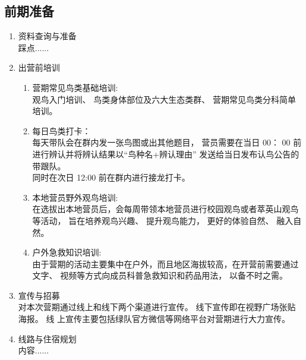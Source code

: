 \documentclass[UTF8,a4paper，12pt]{ctexart}
\begin{document}
\subsection{前期准备}
\begin{enumerate}[itemindent=1em]
    \item  资料查询与准备\\踩点......
    \item  出营前培训\\
        \begin{enumerate}[itemindent=1em]
            \item 营期常见鸟类基础培训:\\观鸟入门培训、 鸟类身体部位及六大生态类群、 营期常见鸟类分科简单培训。
            \item 每日鸟类打卡：\\每天带队会在群内发一张鸟图或出其他题目， 营员需要在当日 00： 00 前进行辨认并将辨认结果以“鸟种名+辨认理由” 发送给当日发布认鸟公告的带跟队。\\同时在次日 12:00 前在群内进行接龙打卡。
            \item 本地营员野外观鸟培训:\\在选拔出本地营员后，会每周带领本地营员进行校园观鸟或者萃英山观鸟等活动， 旨在培养观鸟兴趣、 提升观鸟能力， 更好的体验自然、 融入自然。
            \item 户外急救知识培训:\\由于营期的活动主要集中在户外，而且地区海拔较高，在开营前需要通过文字、 视频等方式向成员科普急救知识和药品用法， 以备不时之需。
        \end{enumerate}
    \item 宣传与招募\\
        对本次营期通过线上和线下两个渠道进行宣传。 线下宣传即在视野广场张贴海报。 线
上宣传主要包括绿队官方微信等网络平台对营期进行大力宣传。
    \item 线路与住宿规划\\
        内容......
\end{enumerate}
\end{document}
